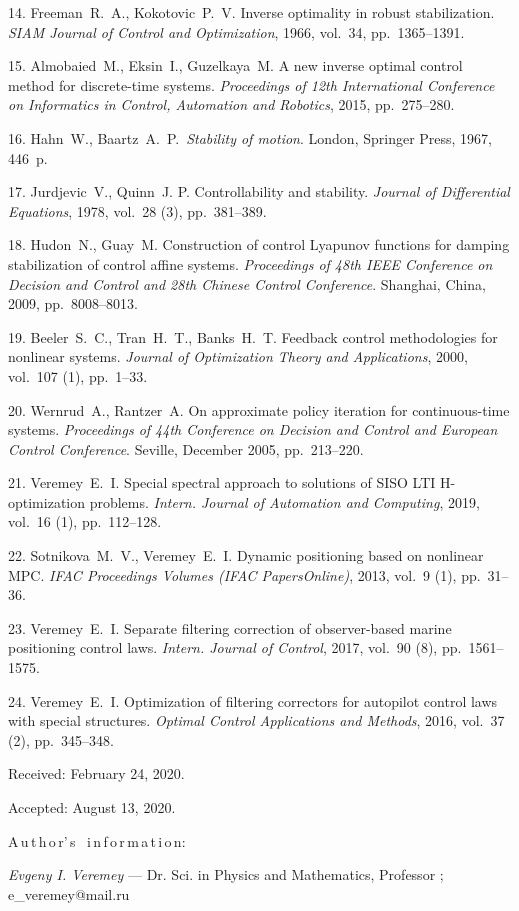 {{14}. Freeman~R.~A., Kokotovic~P.~V. Inverse optimality in robust
stabilization.     \textit {SIAM Journal of Control and
Optimization}, 1966, vol.~34, pp.~1365--1391.

{15}.  Almobaied~M., Eksin~I., Guzelkaya~M. A new inverse optimal
control method for discrete-time systems. \textit {Proceedings of
12th International Conference on Informatics in Control,
Automation and Robotics}, 2015, pp.~275--280.

{16}. Hahn~W., Baartz~A.~P.~\textit {Stability of motion}. London,
Springer Press, 1967, 446~p.

{17}. Jurdjevic~V., Quinn~J. P. Controllability and stability.
\textit {Journal of Differential Equations}, 1978, vol.~28 (3),
pp.~381--389.

{18}. Hudon~N., Guay~M. Construction of control Lyapunov functions
for damping stabilization of control affine  systems. {\it
Proceedings of 48th IEEE Conference on Decision and Control and
28th Chinese Control Conference}. Shanghai, China, 2009,
pp.~8008--8013.

{19}. Beeler~S.~C., Tran~H.~T., Banks~H.~T. Feedback control
methodologies for nonlinear systems. \textit {Journal of
Optimization Theory and Applications}, 2000, vol.~107 (1),
pp.~1--33.

{20}. Wernrud~A., Rantzer~A. On approximate policy iteration for
continuous-time systems. \textit{Proceedings of 44th Conference on
Decision and Control and European Control Conference}. Seville,
December 2005, pp.~213--220.

{21}. Veremey~E.~I. Special spectral approach to solutions of SISO
LTI H-optimization problems. \textit {Intern. Journal of
Automation and Computing}, 2019, vol.~16 (1), pp.~112--128.

{22}. Sotnikova~M.~V., Veremey~E.~I. Dynamic positioning based on
nonlinear MPC.     \textit {IFAC Proceedings Volumes (IFAC
PapersOnline)}, 2013, vol.~9 (1), pp.~31--36.

{23}. Veremey~E.~I. Separate filtering correction of
observer-based marine positioning control laws. \textit {Intern.
Journal of Control}, 2017, vol.~90 (8), pp.~1561--1575.

{24}. Veremey~E.~I. Optimization of filtering correctors for
autopilot control laws with special structures. \textit {Optimal
Control Applications and Methods}, 2016, vol.~37 (2),
pp.~345--348.


\vskip 1.5mm

%


Received:  February 24, 2020.

Accepted: August 13, 2020.

\vskip 4.5mm%
A\,u\,t\,h\,o\,r'\,s \ i\,n\,f\,o\,r\,m\,a\,t\,i\,o\,n:

\vskip 2mm \textit{Evgeny I. Veremey} --- Dr. Sci. in Physics and
Mathematics, Professor%
; e\_veremey@mail.ru


}
